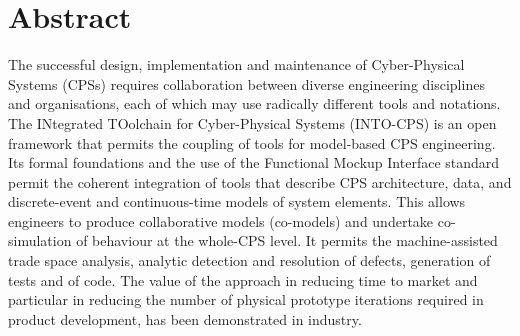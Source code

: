 \documentclass[a4paper,12pt,final]{include/intocpsassociation}   %
\begin{document}
\maketitle
%
%
%
\section*{Abstract}
\label{sec:abstract}
%
The successful design, implementation and maintenance of Cyber-Physical Systems (CPSs) requires collaboration between diverse engineering disciplines and organisations, each of which may use radically different tools and notations.
The INtegrated TOolchain for Cyber-Physical Systems (INTO-CPS) is an open framework that permits the coupling of tools for model-based CPS engineering. Its formal foundations and the use of the Functional Mockup Interface standard permit the coherent integration of tools that describe CPS architecture, data, and discrete-event and continuous-time models of system elements. This allows engineers to produce collaborative models (co-models) and undertake co-simulation of behaviour at the whole-CPS level. It permits the machine-assisted trade space analysis, analytic detection and resolution of defects, generation of tests and of code. The value of the approach in reducing time to market and particular in reducing the number of physical prototype iterations required in product development, has been demonstrated in industry.
\end{document}
